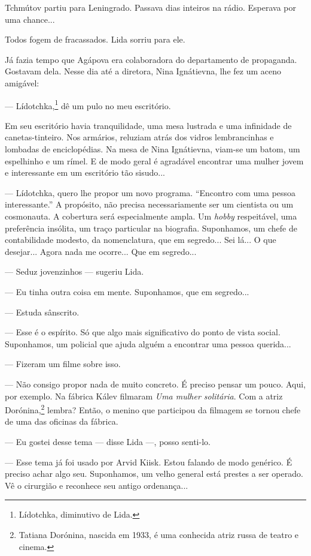 Tchmútov partiu para Leningrado. Passava dias inteiros na rádio.
Esperava por uma chance...

Todos fogem de fracassados. Lida sorriu para ele.

Já fazia tempo que Agápova era colaboradora do departamento de
propaganda. Gostavam dela. Nesse dia até a diretora, Nina Ignátievna,
lhe fez um aceno amigável:

--- Lídotchka,\footnote{Lídotchka, diminutivo de Lida.} dê um pulo no
meu escritório.

Em seu escritório havia tranquilidade, uma mesa lustrada e uma
infinidade de canetas-tinteiro. Nos armários, reluziam atrás dos vidros
lembrancinhas e lombadas de enciclopédias. Na mesa de Nina Ignátievna,
viam-se um batom, um espelhinho e um rímel. E de modo geral é agradável
encontrar uma mulher jovem e interessante em um escritório tão sisudo...

--- Lídotchka, quero lhe propor um novo programa. ``Encontro com uma
pessoa interessante.'' A propósito, não precisa necessariamente ser um
cientista ou um cosmonauta. A cobertura será especialmente ampla. Um
\emph{hobby} respeitável, uma preferência insólita, um traço particular
na biografia. Suponhamos, um chefe de contabilidade modesto, da
nomenclatura, que em segredo... Sei lá... O que desejar... Agora nada me
ocorre... Que em segredo...

--- Seduz jovenzinhos --- sugeriu Lida.

--- Eu tinha outra coisa em mente. Suponhamos, que em segredo...

--- Estuda sânscrito.

--- Esse é o espírito. Só que algo mais significativo do ponto de vista
social. Suponhamos, um policial que ajuda alguém a encontrar uma pessoa
querida...

--- Fizeram um filme sobre isso.

--- Não consigo propor nada de muito concreto. É preciso pensar um
pouco. Aqui, por exemplo. Na fábrica Kálev filmaram \emph{Uma mulher
solitária}. Com a atriz Dorónina,\footnote{Tatiana Dorónina, nascida em
  1933, é uma conhecida atriz russa de teatro e cinema.} lembra? Então,
o menino que participou da filmagem se tornou chefe de uma das oficinas
da fábrica.

--- Eu gostei desse tema --- disse Lida ---, posso senti-lo.

--- Esse tema já foi usado por Arvid Kiisk. Estou falando de modo
genérico. É preciso achar algo seu. Suponhamos, um velho general está
prestes a ser operado. Vê o cirurgião e reconhece seu antigo
ordenança...


